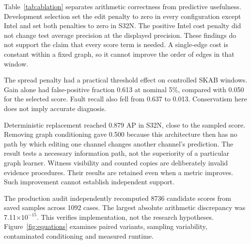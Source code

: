 Table~\ref{tab:ablation} separates arithmetic correctness from predictive usefulness. Development selection set the edit penalty to zero in every configuration except Intel and set both penalties to zero in S32N. The positive Intel cost penalty did not change test average precision at the displayed precision. These findings do not support the claim that every score term is needed. A single-edge cost is constant within a fixed graph, so it cannot improve the order of edges in that window.

The spread penalty had a practical threshold effect on controlled SKAB windows. Gain alone had false-positive fraction 0.613 at nominal 5\%, compared with 0.050 for the selected score. Fault recall also fell from 0.637 to 0.013. Conservatism here does not imply accurate diagnosis.

Deterministic replacement reached 0.879 AP in S32N, close to the sampled score. Removing graph conditioning gave 0.500 because this architecture then has no path by which editing one channel changes another channel's prediction. The result tests a necessary information path, not the superiority of a particular graph learner. Witness visibility and counted copies are deliberately invalid evidence procedures. Their results are retained even when a metric improves. Such improvement cannot establish independent support.

The production audit independently recomputed 8736 candidate scores from saved samples across 1092 cases. The largest absolute arithmetic discrepancy was 7.11$\times10^{-15}$. This verifies implementation, not the research hypotheses. Figure~\ref{fig:equations} examines paired variants, sampling variability, contaminated conditioning and measured runtime.
